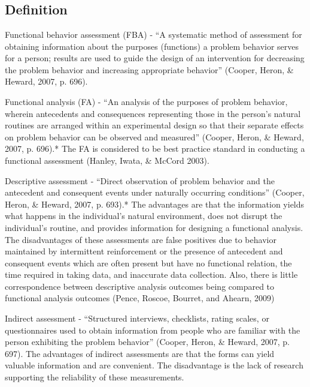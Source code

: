 \clearpage \section[\fouriFour{}]{\fouriFour{}%
              }
\subsection{Definition}
Functional behavior assessment (FBA) - ``A systematic method of assessment for obtaining information about the purposes (functions) a problem behavior serves for a person; results are used to guide the design of an intervention for decreasing the problem behavior and increasing appropriate behavior'' (Cooper, Heron, \& Heward, 2007, p. 696).

Functional analysis (FA) - ``An analysis of the purposes of problem behavior, wherein antecedents and consequences representing those in the person's natural routines are arranged within an experimental design so that their separate effects on problem behavior can be observed and measured'' (Cooper, Heron, \& Heward, 2007, p. 696).* The FA is considered to be best practice standard in conducting a functional assessment (Hanley, Iwata, \& McCord 2003).  

Descriptive assessment - ``Direct observation of problem behavior and the antecedent and consequent events under naturally occurring conditions'' (Cooper, Heron, \& Heward, 2007, p. 693).* The advantages are that the information yields what happens in the individual's natural environment, does not disrupt the individual's routine, and provides information for designing a functional analysis. The disadvantages of these assessments are false positives due to behavior maintained by intermittent reinforcement or the presence of antecedent and consequent events which are often present but have no functional relation, the time required in taking data, and inaccurate data collection. Also, there is little correspondence between descriptive analysis outcomes being compared to functional analysis outcomes (Pence, Roscoe, Bourret, and Ahearn, 2009)

Indirect assessment - ``Structured interviews, checklists, rating scales, or questionnaires used to obtain information from people who are familiar with the person exhibiting the problem behavior'' (Cooper, Heron, \& Heward, 2007, p. 697).  The advantages of indirect assessments are that the forms can yield valuable information and are convenient.  The disadvantage is the lack of research supporting the reliability of these measurements.  

